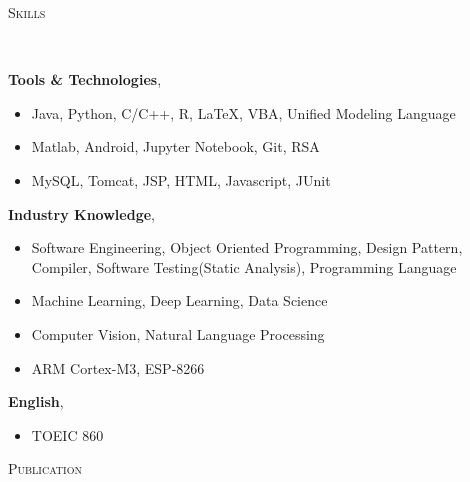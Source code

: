 \documentclass[10pt]{article}
\newenvironment{changemargin}[2]{
  \begin{list}{}{
    \setlength{\topsep}{0pt}
    \setlength{\leftmargin}{#1}
    \setlength{\rightmargin}{#2}
    \setlength{\listparindent}{\parindent}
    \setlength{\itemindent}{\parindent}
    \setlength{\parsep}{\parskip}
  }
  \item[]}{\end{list}
}
\newcommand{\lineover}{
	\begin{changemargin}{-0.05in}{-0.05in}
		\vspace*{-8pt}
		\hrulefill \\
		\vspace*{-2pt}
	\end{changemargin}
}
\newcommand{\header}[1]{
	\begin{changemargin}{-0.5in}{-0.5in}
		\scshape{#1}\\
  	\lineover
	\end{changemargin}
}
\newcommand{\labdescription}[1]{
	\begin{changemargin}{0.15in}{0.15in}
    \smallskip
		{#1}
    \medskip
	\end{changemargin}
}
\newcommand{\labtitle}[3]{
	\textbf{#1}, \emph{#2} \hfill \emph{#3}\\
}
\newenvironment{body} {
	\vspace*{-16pt}
	\begin{changemargin}{-0.25in}{-0.5in}
  }
	{\end{changemargin}
}
\begin{document}
\medskip


\header{Skills}

\begin{body}
	\vspace{14pt}

  	\labtitle{Tools \& Technologies}{}{}
  \labdescription {
  	\begin{itemize} \itemsep -0pt  %
      \item Java, Python, C/C++, R, LaTeX, VBA, Unified Modeling Language
      \item Matlab, Android, Jupyter Notebook, Git, RSA
      \item MySQL, Tomcat, JSP, HTML, Javascript, JUnit
  	\end{itemize}
  }
  
  	\labtitle{Industry Knowledge}{}{}
  \labdescription {
  	\begin{itemize} \itemsep -0pt  %
      \item Software Engineering, Object Oriented Programming, Design Pattern, Compiler, Software Testing(Static Analysis), Programming Language
      \item Machine Learning, Deep Learning, Data Science
      \item Computer Vision, Natural Language Processing
      \item ARM Cortex-M3, ESP-8266
  	\end{itemize}
  }
  
  	\labtitle{English}{}{}
  \labdescription {
  	\begin{itemize} \itemsep -0pt  %
      \item TOEIC 860
  	\end{itemize}
  }

\end{body}

\medskip


\header{Publication}
\end{document}
